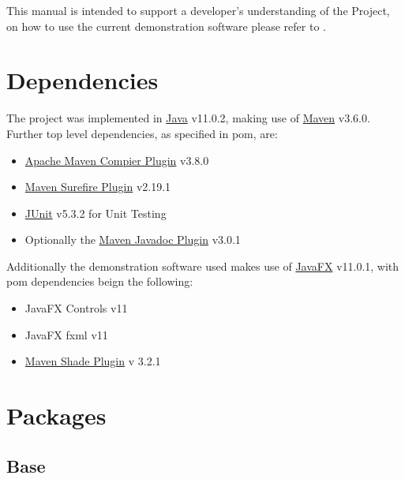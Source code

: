 \documentclass[main.tex]{subfiles}
\begin{document}
  
  This manual is intended to support a developer's understanding of the Project, on how to use the current demonstration software please refer to .
  
  \section*{Dependencies}
  
    The project was implemented in \href{https://openjdk.java.net/projects/jdk/11/}{Java} v11.0.2, making use of \href{http://maven.apache.org/}{Maven} v3.6.0. Further top level dependencies, as specified in pom, are:
    \begin{itemize}
      \item \href{https://maven.apache.org/plugins/maven-compiler-plugin/index.html}{Apache Maven Compier Plugin} v3.8.0
      \item \href{https://maven.apache.org/surefire/maven-surefire-plugin/}{Maven Surefire Plugin} v2.19.1
      \item \href{https://junit.org/junit5/}{JUnit} v5.3.2 for Unit Testing
      \item Optionally the \href{https://maven.apache.org/plugins/maven-javadoc-plugin/}{Maven Javadoc Plugin} v3.0.1
    \end{itemize}
    Additionally the demonstration software used makes use of \href{https://openjfx.io/}{JavaFX} v11.0.1, with pom dependencies beign the following:
    \begin{itemize}
      \item JavaFX Controls v11
      \item JavaFX fxml v11
      \item \href{https://maven.apache.org/plugins/maven-shade-plugin/}{Maven Shade Plugin} v 3.2.1
    \end{itemize}
  
  \section*{Packages}
    
    \subsection*{Base}
    
\end{document}
